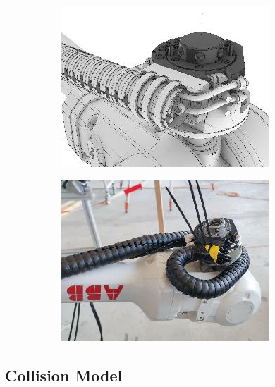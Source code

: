 \documentclass[11pt]{book}
\begin{document}
\begin{figure}[H]
\centering
\begin{subfigure}[b]{0.45\textwidth}
\centering
\includegraphics[width=\textwidth]{./images/image7.jpeg}
\end{subfigure}
\hfill
\begin{subfigure}[b]{0.45\textwidth}
\centering
\includegraphics[width=\textwidth]{./images/image8.jpeg}
\end{subfigure}
\end{figure}


\subsection{Collision Model}
\end{document}
